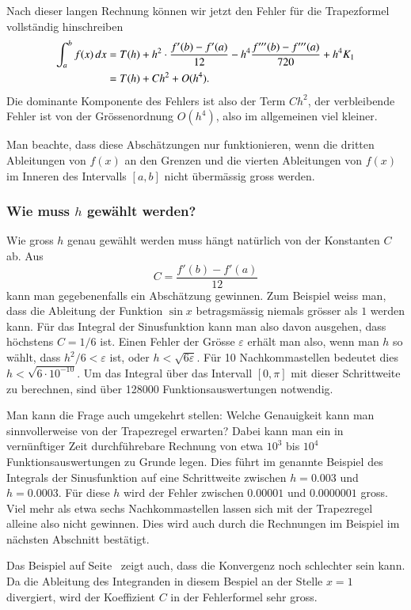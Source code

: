Nach dieser langen Rechnung können wir jetzt den Fehler für die
Trapezformel vollständig hinschreiben
\begin{align}
\int_a^b f(x)\,dx
&=
T(h) + h^2 \cdot \frac{f'(b)-f'(a)}{12} - h^4 \frac{f'''(b)-f'''(a)}{720}
+h^4 K_1
\notag
\\
&=
T(h) + Ch^2 + O(h^4).
\label{buch:equation:trapezfehler}
\end{align}
Die dominante Komponente des Fehlers ist also der Term $Ch^2$, 
der verbleibende Fehler ist von der Grössenordnung $O(h^4)$, also
im allgemeinen viel kleiner.

Man beachte, dass diese Abschätzungen nur funktionieren, wenn die
dritten Ableitungen von $f(x)$ an den Grenzen und die vierten Ableitungen
von $f(x)$ im Inneren des Intervalls $[a,b]$ nicht übermässig gross werden.
%

\subsubsection{Wie muss $h$ gewählt werden?}
Wie gross $h$ genau gewählt werden muss hängt natürlich von der Konstanten
$C$ ab.
Aus
\[
C=\frac{f'(b)-f'(a)}{12}
\]
kann man gegebenenfalls ein Abschätzung gewinnen.
Zum Beispiel weiss man, dass die Ableitung der Funktion $\sin x$
betragsmässig niemals grösser als $1$ werden kann.
Für das Integral der Sinusfunktion kann man also davon ausgehen, dass
höchstens $C=1/6$ ist.
Einen Fehler der Grösse $\varepsilon$ erhält man also, wenn man $h$ so wählt,
dass $h^2/6 < \varepsilon$ ist, oder $h<\sqrt{6\varepsilon}$.
Für 10 Nachkommastellen bedeutet dies $h < \sqrt{6\cdot10^{-10}}$.
Um das Integral über das Intervall $[0,\pi]$ mit dieser Schrittweite
zu berechnen, sind über 128000 Funktionsauswertungen notwendig.

Man kann die Frage auch umgekehrt stellen: Welche Genauigkeit kann man
sinnvollerweise von der Trapezregel erwarten?
Dabei kann man ein in vernünftiger Zeit durchführebare Rechnung von
etwa $10^3$ bis $10^4$ Funktionsauswertungen zu Grunde legen.
Dies führt im genannte Beispiel des Integrals der Sinusfunktion auf
eine Schrittweite zwischen $h=0.003$ und $h=0.0003$.
%
Für diese $h$ wird der Fehler zwischen $0.00001$ und $0.0000001$ gross.
Viel mehr als etwa sechs Nachkommastellen lassen sich mit der Trapezregel
alleine also nicht gewinnen.
Dies wird auch durch die Rechnungen im Beispiel im nächsten Abschnitt
bestätigt.

Das Beispiel auf Seite~\pageref{buch:beispiel:kreis} zeigt auch, dass
die Konvergenz noch schlechter sein kann.
%
Da die Ableitung des Integranden in diesem Bespiel an der Stelle $x=1$
divergiert, wird der Koeffizient $C$ in der Fehlerformel sehr gross.

